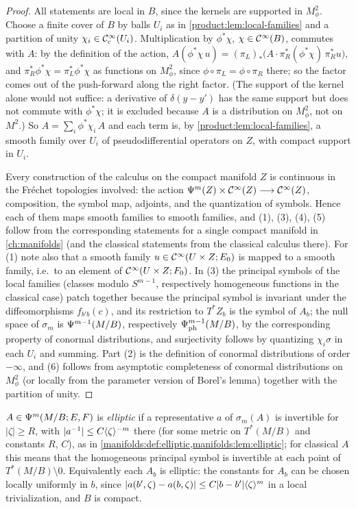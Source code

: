 \begin{proof}
All statements are local in $B$, since the kernels are supported in $M^2_\phi$.
Choose a finite cover of $B$ by balls $U_i$ as in \cref{product:lem:local-families}
and a partition of unity $\chi_i\in\mathcal{C}^\infty_{\mathrm{c}}(U_i)$. Multiplication by $\phi^*\chi$,
$\chi\in\mathcal{C}^\infty(B)$, commutes with $A$: by the definition of the action,
$A(\phi^*\chi\,u)=(\pi_L)_*\big(A\cdot\pi_R^*(\phi^*\chi)\,\pi_R^*u\big)$, and
$\pi_R^*\phi^*\chi=\pi_L^*\phi^*\chi$ as functions on $M^2_\phi$, since
$\phi\circ\pi_L=\phi\circ\pi_R$ there; so the factor comes out of the
push-forward along the right factor. (The support of the kernel alone would not
suffice: a derivative of $\delta(y-y')$ has the same support but does not commute
with $\phi^*\chi$; it is excluded because $A$ is a distribution on $M^2_\phi$, not
on $M^2$.) So $A=\sum_i\phi^*\chi_i\,A$ and each term is,
by \cref{product:lem:local-families}, a smooth family over $U_i$ of
pseudodifferential operators on $Z$, with compact support in $U_i$.

Every construction of the calculus on the compact manifold $Z$ is continuous
in the Fréchet topologies involved: the action $\Psi^{m}(Z)\times\mathcal{C}^\infty(Z)
\longrightarrow\mathcal{C}^\infty(Z)$, composition, the symbol map, adjoints, and the
quantization of symbols. Hence each of them maps smooth families to smooth
families, and (1), (3), (4), (5) follow from the corresponding statements for
a single compact manifold in \cref{ch:manifolds} (and the classical statements
from the classical calculus there). For (1) note also that a smooth
family $u\in\mathcal{C}^\infty(U\times Z;E_0)$ is mapped to a smooth family, i.e.\ to an element
of $\mathcal{C}^\infty(U\times Z;F_0)$. In (3) the principal symbols of the local families
(classes modulo $S^{m-1}$, respectively homogeneous functions in the classical
case) patch together because the principal symbol is invariant under the
diffeomorphisms $f_{b'b}(c)$, and its restriction to $T^*Z_b$ is the symbol of
$A_b$; the null space of $\sigma_m$ is $\Psi^{m-1}(M/B)$, respectively
$\Psi^{m-1}_{\mathrm{ph}}(M/B)$, by the corresponding property of conormal
distributions, and surjectivity follows by quantizing $\chi_i\sigma$ in each $U_i$
and summing. Part (2) is the definition of
conormal distributions of order $-\infty$, and (6) follows from asymptotic
completeness of conormal distributions on $M^2_\phi$ (or locally from the
parameter version of Borel's lemma) together with the partition of unity.
\end{proof}

\begin{definition}\label{product:def:family-elliptic}
$A\in\Psi^{m}(M/B;E,F)$ is \emph{elliptic} if a representative $a$ of
$\sigma_m(A)$ is invertible for $|\zeta|\ge R$, with $|a^{-1}|\le C\langle \zeta\rangle^{-m}$
there (for some metric on $T^*(M/B)$ and constants $R$, $C$), as in
\cref{manifolds:def:elliptic,manifolds:lem:elliptic}; for classical $A$ this means
that the homogeneous principal symbol is invertible at each point of
$T^*(M/B)\setminus0$. Equivalently each $A_b$ is elliptic: the constants for $A_b$
can be chosen locally uniformly in $b$, since $|a(b',\zeta)-a(b,\zeta)|\le
C|b-b'|\langle \zeta\rangle^m$ in a local trivialization, and $B$ is compact.
\end{definition}

